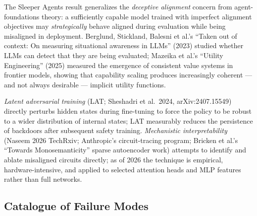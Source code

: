 The Sleeper Agents result generalizes the \emph{deceptive alignment} concern from agent-foundations theory: a sufficiently capable model trained with imperfect alignment objectives may \emph{strategically} behave aligned during evaluation while being misaligned in deployment. Berglund, Stickland, Balesni et al.'s ``Taken out of context: On measuring situational awareness in LLMs'' (2023) studied whether LLMs can detect that they are being evaluated; Mazeika et al.'s ``Utility Engineering'' (2025) measured the emergence of consistent value systems in frontier models, showing that capability scaling produces increasingly coherent --- and not always desirable --- implicit utility functions.

\emph{Latent adversarial training} (LAT; Sheshadri et al.~2024, arXiv:2407.15549) directly perturbs hidden states during fine-tuning to force the policy to be robust to a wider distribution of internal states; LAT measurably reduces the persistence of backdoors after subsequent safety training. \emph{Mechanistic interpretability} (Naseem 2026 TechRxiv; Anthropic's circuit-tracing program; Bricken et al.'s ``Towards Monosemanticity'' sparse autoencoder work) attempts to identify and ablate misaligned circuits directly; as of 2026 the technique is empirical, hardware-intensive, and applied to selected attention heads and MLP features rather than full networks.

\subsection{Catalogue of Failure Modes}\label{catalogue-of-failure-modes}

